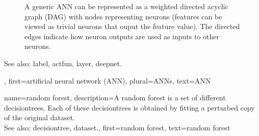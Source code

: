 {{\begin{figure}[H]
\begin{tikzpicture}[>=stealth, node distance=1.4cm and 1.6cm]
 			\end{tikzpicture}
 			\caption{A generic ANN can be represented as a weighted directed acyclic graph (DAG) with 
			nodes representing neurons (\glspl{feature} can be viewed as trivial neurons that ouput 
			the \gls{feature} value). The directed edges indicate how neuron outputs 
			are used as inputs to other neurons. \label{fig_ANN_DAG_dict}}
 			\end{figure}
		See also: \gls{label}, \gls{actfun}, \gls{layer}, \gls{deepnet}.},
	first={artificial neural network (ANN)},
	plural={ANNs},
	text={ANN}
}


{name={random forest},
	description={A random forest is a set of different \glspl{decisiontree}. 
		Each of these \glspl{decisiontree} is obtained by fitting a perturbed copy of 
		the original \gls{dataset}.
				\\
		See also: \gls{decisiontree}, \gls{dataset}.},
	first={random forest}, 
	text={random forest}
}


